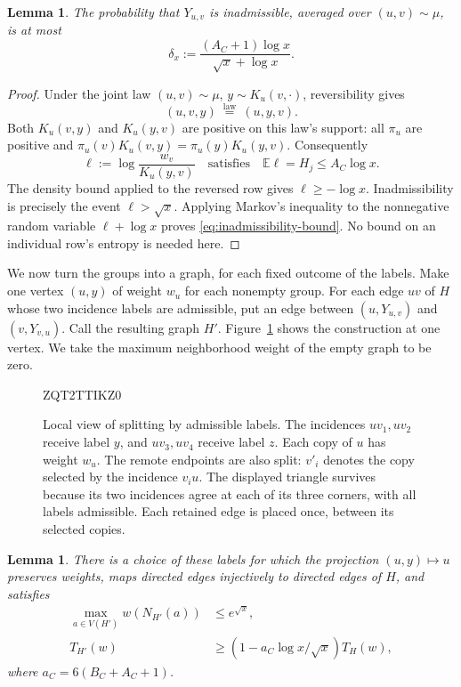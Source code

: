 \documentclass[11pt]{article}
\newtheorem{lemma}[theorem]{Lemma}
\theoremstyle{definition}
\theoremstyle{remark}
\numberwithin{equation}{section}
\begin{document}
\begin{lemma}\label{lem:reverse-admissibility}
The probability that $Y_{u,v}$ is inadmissible, averaged over
$(u,v)\sim\mu$, is at most
\begin{equation}\label{eq:inadmissibility-bound}
 \delta_x:=\frac{(A_C+1)\log x}{\sqrt x+\log x}.
\end{equation}
\end{lemma}

\begin{proof}
Under the joint law $(u,v)\sim\mu$, $y\sim K_u(v,\cdot)$,
reversibility gives
\[
 (u,v,y)\ \stackrel{\mathrm{law}}=\ (u,y,v).
\]
Both $K_u(v,y)$ and $K_u(y,v)$ are positive on this law's support:
all $\pi_u$ are positive and
$\pi_u(v)K_u(v,y)=\pi_u(y)K_u(y,v)$.
Consequently
\[
 \ell:=\log\frac{w_v}{K_u(y,v)}
 \quad\text{satisfies}\quad
 \mathbb E\ell=H_j\le A_C\log x.
\]
The density bound applied to the reversed row gives $\ell\ge-\log x$.
Inadmissibility is precisely the event $\ell>\sqrt x$. Applying Markov's
inequality to the nonnegative random variable $\ell+\log x$ proves
\eqref{eq:inadmissibility-bound}. No bound on an individual row's
entropy is needed here.
\end{proof}

We now turn the groups into a graph, for each fixed outcome of the labels.
Make one vertex $(u,y)$ of weight $w_u$ for each nonempty group.
For each edge $uv$ of $H$ whose two incidence labels are admissible,
put an edge between $(u,Y_{u,v})$ and $(v,Y_{v,u})$.
Call the resulting graph $H'$. Figure~\ref{fig:label-splitting} shows
the construction at one vertex.
We take the maximum neighborhood weight of the empty graph to be zero.
\begin{figure}[htbp]
  
  \begingroup
  ZQT2TTIKZ0
  \endgroup
  \caption{Local view of splitting by admissible labels. The incidences
    $uv_1,uv_2$ receive label $y$, and $uv_3,uv_4$ receive label $z$.
    Each copy of $u$ has weight $w_u$. The remote endpoints are also split:
    $v'_i$ denotes the copy selected by the incidence $v_i u$.
    The displayed triangle survives because its two incidences agree at
    each of its three corners, with all labels admissible. Each retained
    edge is placed once, between its selected copies.}
  \label{fig:label-splitting}
\end{figure}


\begin{lemma}\label{lem:weighted-splitting}
There is a choice of these labels for which the projection
$(u,y)\mapsto u$ preserves weights, maps directed edges injectively
to directed edges of $H$, and satisfies
\begin{align}
 \max_{a\in V(H')}w(N_{H'}(a))&\le e^{\sqrt x},
 \label{eq:split-neighborhood}\\
 T_{H'}(w)&\ge(1-a_C\log x/\sqrt x)T_H(w),
 \label{eq:split-triangles}
\end{align}
where $a_C=6(B_C+A_C+1)$.
\end{lemma}
\end{document}
